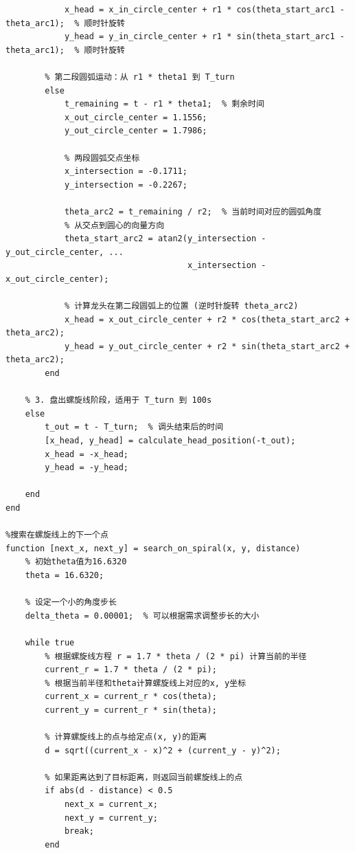 \documentclass{cumcmthesis1}
\begin{document}
\begin{lstlisting}[caption={求解问题4中-100s到100s位置和速度的代码，并将计算结果保存到result4.xlsx中}, label={lst:eighth_code}]
            % 计算龙头在第一段圆弧上的位置
            x_head = x_in_circle_center + r1 * cos(theta_start_arc1 - theta_arc1);  % 顺时针旋转
            y_head = y_in_circle_center + r1 * sin(theta_start_arc1 - theta_arc1);  % 顺时针旋转
            
        % 第二段圆弧运动：从 r1 * theta1 到 T_turn
        else
            t_remaining = t - r1 * theta1;  % 剩余时间
            x_out_circle_center = 1.1556;
            y_out_circle_center = 1.7986;
            
            % 两段圆弧交点坐标
            x_intersection = -0.1711;
            y_intersection = -0.2267;
            
            theta_arc2 = t_remaining / r2;  % 当前时间对应的圆弧角度
            % 从交点到圆心的向量方向
            theta_start_arc2 = atan2(y_intersection - y_out_circle_center, ...
                                     x_intersection - x_out_circle_center);
                                 
            % 计算龙头在第二段圆弧上的位置 (逆时针旋转 theta_arc2)
            x_head = x_out_circle_center + r2 * cos(theta_start_arc2 + theta_arc2);  
            y_head = y_out_circle_center + r2 * sin(theta_start_arc2 + theta_arc2);  
        end
    
    % 3. 盘出螺旋线阶段，适用于 T_turn 到 100s
    else
        t_out = t - T_turn;  % 调头结束后的时间
        [x_head, y_head] = calculate_head_position(-t_out);
        x_head = -x_head;
        y_head = -y_head;
        
    end
end

%搜索在螺旋线上的下一个点
function [next_x, next_y] = search_on_spiral(x, y, distance)
    % 初始theta值为16.6320
    theta = 16.6320;
    
    % 设定一个小的角度步长
    delta_theta = 0.00001;  % 可以根据需求调整步长的大小
    
    while true
        % 根据螺旋线方程 r = 1.7 * theta / (2 * pi) 计算当前的半径
        current_r = 1.7 * theta / (2 * pi);
        % 根据当前半径和theta计算螺旋线上对应的x, y坐标
        current_x = current_r * cos(theta);
        current_y = current_r * sin(theta);
        
        % 计算螺旋线上的点与给定点(x, y)的距离
        d = sqrt((current_x - x)^2 + (current_y - y)^2);
        
        % 如果距离达到了目标距离，则返回当前螺旋线上的点
        if abs(d - distance) < 0.5
            next_x = current_x;
            next_y = current_y;
            break;
        end
        

\end{lstlisting}
\end{document}
